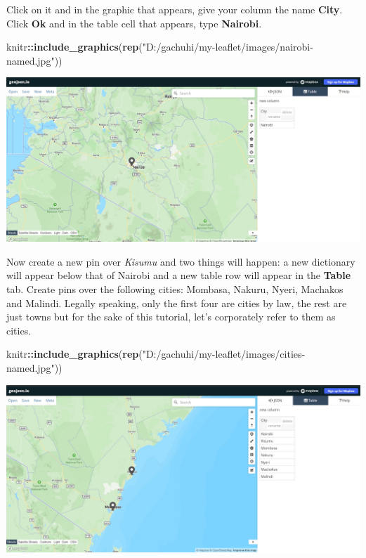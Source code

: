 \documentclass[
]{book}
\newenvironment{Shaded}{\begin{snugshade}}{\end{snugshade}}
\newcommand{\FunctionTok}[1]{\textcolor[rgb]{0.13,0.29,0.53}{\textbf{#1}}}
\newcommand{\NormalTok}[1]{#1}
\newcommand{\SpecialCharTok}[1]{\textcolor[rgb]{0.81,0.36,0.00}{\textbf{#1}}}
\newcommand{\StringTok}[1]{\textcolor[rgb]{0.31,0.60,0.02}{#1}}
\begin{document}
Click on it and in the graphic that appears, give your column the name \textbf{City}. Click \textbf{Ok} and in the table cell that appears, type \textbf{Nairobi}.

\begin{Shaded}
\begin{Highlighting}[]
\NormalTok{knitr}\SpecialCharTok{::}\FunctionTok{include\_graphics}\NormalTok{(}\FunctionTok{rep}\NormalTok{(}\StringTok{"D:/gachuhi/my{-}leaflet/images/nairobi{-}named.jpg"}\NormalTok{))}
\end{Highlighting}
\end{Shaded}

\includegraphics{../images/nairobi-named.jpg}

Now create a new pin over \emph{Kisumu} and two things will happen: a new dictionary will appear below that of Nairobi and a new table row will appear in the \textbf{Table} tab. Create pins over the following cities: Mombasa, Nakuru, Nyeri, Machakos and Malindi. Legally speaking, only the first four are cities by law, the rest are just towns but for the sake of this tutorial, let's corporately refer to them as cities.

\begin{Shaded}
\begin{Highlighting}[]
\NormalTok{knitr}\SpecialCharTok{::}\FunctionTok{include\_graphics}\NormalTok{(}\FunctionTok{rep}\NormalTok{(}\StringTok{"D:/gachuhi/my{-}leaflet/images/cities{-}named.jpg"}\NormalTok{))}
\end{Highlighting}
\end{Shaded}

\includegraphics{../images/cities-named.jpg}
\end{document}
